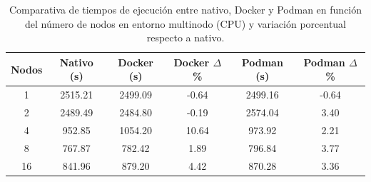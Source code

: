 \begin{table}[ht]
    \centering
    \small
    \setlength{\tabcolsep}{4pt}
    \renewcommand{\arraystretch}{1.1}
    \begin{tabular}{|c|c|c|c|c|c|}
        \hline
        \textbf{Nodos} & \textbf{Nativo (s)} & \textbf{Docker (s)} & \textbf{Docker $\Delta$\%} & \textbf{Podman (s)} & \textbf{Podman $\Delta$\%} \\
        \hline
        1              & 2515.21             & 2499.09             & -0.64                      & 2499.16             & -0.64                      \\
        2              & 2489.49             & 2484.80             & -0.19                      & 2574.04             & 3.40                       \\
        4              & 952.85              & 1054.20             & 10.64                      & 973.92              & 2.21                       \\
        8              & 767.87              & 782.42              & 1.89                       & 796.84              & 3.77                       \\
        16             & 841.96              & 879.20              & 4.42                       & 870.28              & 3.36                       \\
        \hline
    \end{tabular}
    \caption{Comparativa de tiempos de ejecución entre nativo, Docker y Podman en función del número de nodos en entorno multinodo (CPU) y variación porcentual respecto a nativo.}
    \label{tab:multi-node_ubuntu_container_vs_native}
\end{table}

